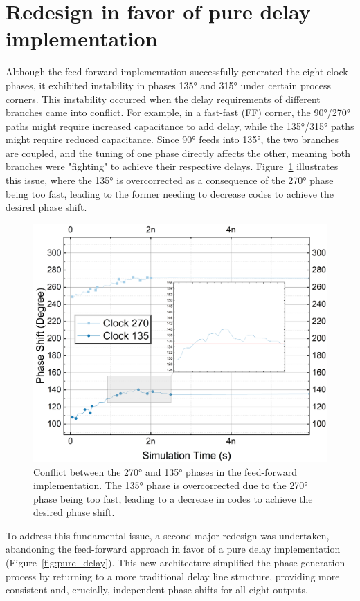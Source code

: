 \section{Redesign in favor of pure delay implementation}\label{sec:second_redesign}

Although the feed-forward implementation successfully generated the eight clock phases, it exhibited instability in phases \ang{135} and \ang{315} under certain process corners. This instability occurred when the delay requirements of different branches came into conflict. For example, in a fast-fast (FF) corner, the \ang{90}/\ang{270} paths might require increased capacitance to add delay, while the \ang{135}/\ang{315} paths might require reduced capacitance. Since \ang{90} feeds into \ang{135}, the two branches are coupled, and the tuning of one phase directly affects the other, meaning both branches were "fighting" to achieve their respective delays. Figure~\ref{fig:FF_8out_225vs135} illustrates this issue, where the \ang{135} is overcorrected as a consequence of the \ang{270} phase being too fast, leading to the former needing to decrease codes to achieve the desired phase shift.

\begin{figure}[H]
  \centering
  \includegraphics[width=0.8\linewidth]{figures/Results/FF_8out_PNPN-FightExample.png}
  \caption{Conflict between the \ang{270} and \ang{135} phases in the feed-forward implementation. The \ang{135} phase is overcorrected due to the \ang{270} phase being too fast, leading to a decrease in codes to achieve the desired phase shift.}
  \label{fig:FF_8out_225vs135}
\end{figure}

To address this fundamental issue, a second major redesign was undertaken, abandoning the feed-forward approach in favor of a pure delay implementation (Figure~\ref{fig:pure_delay}). This new architecture simplified the phase generation process by returning to a more traditional delay line structure, providing more consistent and, crucially, independent phase shifts for all eight outputs.

